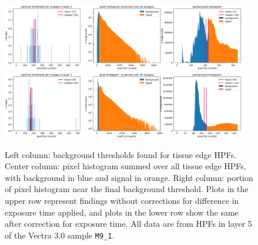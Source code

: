 \documentclass[letterpaper,11pt]{article}
\begin{document}
\begin{figure}[!ht]
\centering
\includegraphics[width=0.95\textwidth]{images/results/thresholding_pre_correction/M9_1_layer_5_background_threshold_plots}
\includegraphics[width=0.95\textwidth]{images/results/thresholding_post_correction/M9_1_layer_5_background_threshold_plots}
\caption{\footnotesize Left column: background thresholds found for tissue edge HPFs. Center column: pixel histogram summed over all tissue edge HPFs, with background in blue and signal in orange. Right column: portion of pixel histogram near the final background threshold. Plots in the upper row represent findings without corrections for difference in exposure time applied, and plots in the lower row show the same after correction for exposure time. All data are from HPFs in layer 5 of the Vectra 3.0 sample \texttt{M9\_1}.}
\label{fig:background_threshold_impact_vectra_layer_5}
\end{figure}
\end{document}
